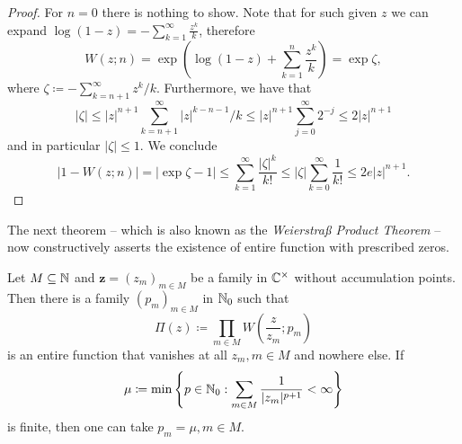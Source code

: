 \begin{proof}
    For $n = 0$ there is nothing to show. Note that for such given $z$ we can expand $\log (1 - z) = - \sum_{k=1}^\infty \frac{z^k}{k}$, therefore
    \begin{equation*}
        W(z; n) = \exp \left( \log(1-z) + \sum_{k=1}^n \frac{z^k}{k} \right) = \exp \zeta,
    \end{equation*}
    where $\zeta \coloneqq - \sum_{k=n+1}^\infty z^k / k$. Furthermore, we have that
    \begin{equation*}
        \vert \zeta \vert \leq \vert z \vert^{n+1} \sum_{k=n+1}^\infty \vert z \vert^{k-n-1} / k \leq \vert z \vert^{n+1} \sum_{j=0}^\infty 2^{-j} \leq 2 \vert z \vert^{n+1}
    \end{equation*}
    and in particular $\vert \zeta \vert \leq 1$. We conclude
    \begin{equation*}
        \vert 1 - W(z; n) \vert = \vert \exp \zeta - 1 \vert \leq \sum_{k=1}^\infty \frac{\vert \zeta \vert^k}{k!} \leq \vert \zeta \vert \sum_{k=0}^\infty \frac{1}{k!} \leq 2 e \vert z \vert^{n+1}.
    \end{equation*}
\end{proof}

The next theorem -- which is also known as the \emph{Weierstraß Product Theorem} -- now constructively asserts the existence of entire function with prescribed zeros.

\begin{theorem} \label{thm:function-with-prescribed-zeros}
    Let $M \subseteq \mathbb{N}$ and $\mathbf{z} = (z_m)_{m \in M}$ be a family in $\mathbb{C}^\times$ without accumulation points. Then there is a family $(p_m)_{m \in M}$ in $\mathbb{N}_0$ such that
    \begin{equation}
        \Pi(z) \coloneqq \prod_{m \in M} W\left(\frac{z}{z_m}; p_m\right)
    \end{equation}
    is an entire function that vanishes at all $z_m, m \in M$ and nowhere else. If
    \begin{equation}
        \mu \coloneqq \min \left\{ p \in \mathbb{N}_0 : \sum_{m \in M} \frac{1}{\vert z_m \vert^{p+1}} < \infty \right\}
    \end{equation}
    is finite, then one can take $p_m = \mu, m \in M$.
\end{theorem}

